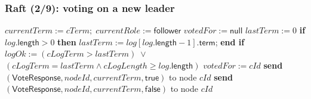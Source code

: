 \begin{frame}
    \label{s:raft2}
    \frametitle{Raft (2/9): voting on a new leader}
    \footnotesize
    \begin{algorithmic}
        \State
                \State $\mathit{currentTerm} := \mathit{cTerm};\; \mathit{currentRole} := \mathsf{follower}$
                \State $\mathit{votedFor} := \mathsf{null}$
            \EndIf
            \State $\mathit{lastTerm} := 0$
            \State \textbf{if} $\mathit{log}.\mathsf{length} > 0$ \textbf{then} $\mathit{lastTerm} := \mathit{log}[\mathit{log}.\mathsf{length} - 1].\mathsf{term}$; \textbf{end if}
            \State $\mathit{logOk} := (\mathit{cLogTerm} > \mathit{lastTerm}) \;\vee$
            \State \hspace{25pt}$(\mathit{cLogTerm} = \mathit{lastTerm} \wedge \mathit{cLogLength} \ge \mathit{log}.\mathsf{length})$
            \State
                \State $\mathit{votedFor} := \mathit{cId}$
                \State \textbf{send} $(\mathsf{VoteResponse}, \mathit{nodeId}, \mathit{currentTerm}, \mathsf{true})$ to node $\mathit{cId}$
            \Else
                \State \textbf{send} $(\mathsf{VoteResponse}, \mathit{nodeId}, \mathit{currentTerm}, \mathsf{false})$ to node $\mathit{cId}$
            \EndIf
        \EndOn
        \State
    \end{algorithmic}
\end{frame}
\label{l:raft2}


